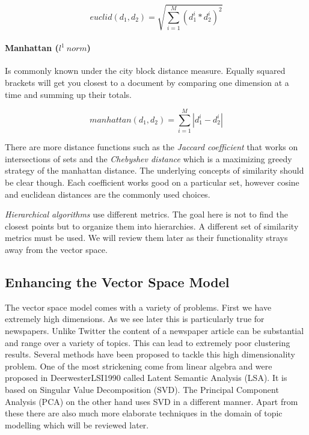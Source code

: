     \begin{equation}
      euclid(d_1, d_2) = \sqrt{\sum_{i=1}^{M}(d_1^i * d_2^i)^2}
    \end{equation}

    \paragraph{Manhattan ($l^1\:norm$)}
    Is commonly known under the city block distance measure. Equally squared brackets
    will get you closest to a document by comparing one dimension at a time and summing up their totals.

    \begin{equation}
      manhattan(d_1, d_2) = \sum_{i=1}^{M}|d_1^i - d_2^i|
    \end{equation}

    There are more distance functions such as the \emph{Jaccard coefficient} that works on intersections of sets and the \emph{Chebyshev distance} which is a maximizing greedy strategy of the manhattan distance. The underlying concepts of similarity should be clear though. Each coefficient works good on a particular set, however cosine and euclidean distances are the commonly used choices.

    \emph{Hierarchical algorithms} use different metrics. The goal here is not to find the closest points but to organize them into hierarchies. A different set of similarity metrics must be used. We will review them later as their functionality strays away from the vector space.

  \subsection{Enhancing the Vector Space Model}

    The vector space model comes with a variety of problems. First we have extremely high dimensions. As we see later this is particularly true for newspapers. Unlike Twitter the content of a newspaper article can be substantial and range over a variety of topics. This can lead to extremely poor clustering results. Several methods have been proposed to tackle this high dimensionality problem. One of the most strickening come from linear algebra and were proposed in DeerwesterLSI1990 called Latent Semantic Analysis (LSA). It is based on Singular Value Decomposition (SVD). The Principal Component Analysis (PCA) on the other hand uses SVD in a different manner. Apart from these there are also much more elaborate techniques in the domain of topic modelling which will be reviewed later.

